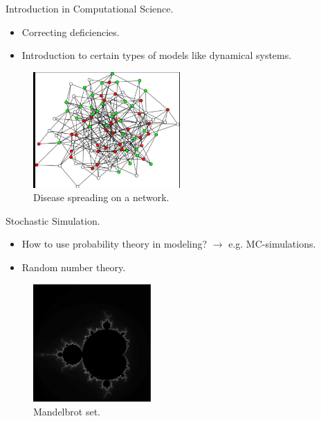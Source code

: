 \documentclass[red]{beamer}
\begin{document}
\begin{frame}{Introduction in Computational Science.}
  \begin{itemize}
  \item 
    Correcting deficiencies.
  \item
    Introduction to certain types of models like dynamical systems.
  \end{itemize}
  \begin{figure}[H]
    \centering
    \includegraphics[width = 0.5\textwidth]{SIR.png}
    \caption{Disease spreading on a network.}
  \end{figure}
\end{frame}

\begin{frame}{Stochastic Simulation.}
  \begin{itemize}
  \item 
    How to use probability theory in modeling? $\rightarrow$ e.g. MC-simulations.
  \item
    Random number theory.
  \end{itemize}
  \begin{figure}[H]
    \centering
    \includegraphics[width = 0.4\textwidth]{mandelbrot.pdf}
    \caption{Mandelbrot set.}
  \end{figure}
\end{frame}
\end{document}
